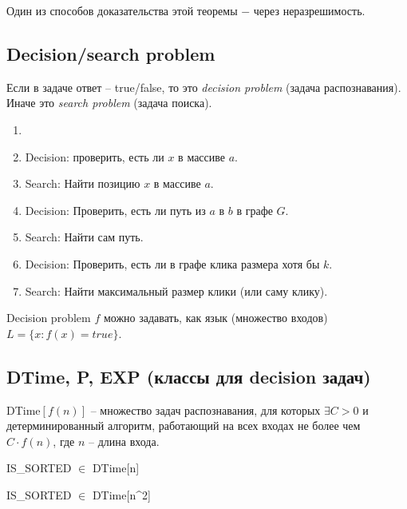 Один из способов доказательства этой теоремы $-$ через неразрешимость.

\subsection{Decision/search problem}

\begin{definition}
    Если в задаче ответ – true/false, то это \textit{decision problem} (задача распознавания). Иначе это \textit{search problem} (задача поиска).
\end{definition}

\begin{example}
    \begin{enumerate}
        \item[]
        \item Decision: проверить, есть ли $x$ в массиве $a$.
        \item Search: Найти позицию $x$ в массиве $a$.
        \item Decision: Проверить, есть ли путь из $a$ в $b$ в графе $G$.
        \item Search: Найти сам путь.
        \item Decision: Проверить, есть ли в графе клика размера хотя бы $k$.
        \item Search: Найти максимальный размер клики (или саму клику).
    \end{enumerate}
\end{example}

\begin{remark}
    Decision problem $f$ можно задавать, как язык (множество входов) $L = \{x: f(x) = true\}$.
\end{remark}

\subsection{DTime, P, EXP (классы для decision задач)}

\begin{definition}
    DTime$[f(n)]$ – множество задач распознавания, для которых $∃C > 0$ и детерминированный алгоритм, работающий на всех входах не более чем $C \cdot f(n)$, где $n$ – длина входа.
\end{definition}

\begin{example}
    IS\_SORTED $\in$ DTime[n]

    IS\_SORTED $\in$ DTime[n^2]
\end{example}

